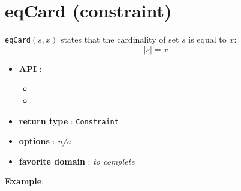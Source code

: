 \label{eqcard}
\hypertarget{eqcard}{}

\section{eqCard (constraint)}\label{eqcard:eqcardconstraint}\hypertarget{eqcard:eqcardconstraint}{}
\begin{notedef}
  \texttt{eqCard}$(s,x)$ states that the cardinality of set $s$ is equal to $x$:
$$|s| = x$$
\end{notedef}

\begin{itemize}
	\item \textbf{API} :
	\begin{itemize}
		\item {}
		\item {}
	\end{itemize}
	\item \textbf{return type} : \texttt{Constraint}
	\item \textbf{options} : \emph{n/a}
	\item \textbf{favorite domain} : \emph{to complete}
\end{itemize}

\textbf{Example}:

